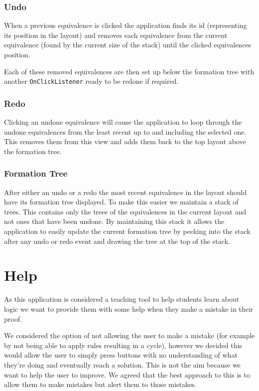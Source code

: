 \documentclass{report}
\begin{document}
\subsubsection{Undo}

When a previous equivalence is clicked the application finds its id (representing its position in the layout) and removes each equivalence from the current equivalence (found by the current size of the stack) until the clicked equivalences position. 

Each of these removed equivalences are then set up below the formation tree with another {\tt OnClickListener} ready to be redone if required.

\subsubsection{Redo}

Clicking an undone equivalence will cause the application to loop through the undone equivalences from the least recent up to and including the selected one. This removes them from this view and adds them back to the top layout above the formation tree. 

\subsubsection{Formation Tree}

After either an undo or a redo the most recent equivalence in the layout should have its formation tree displayed. To make this easier we maintain a stack of trees. This contains only the trees of the equivalences in the current layout and not ones that have been undone. By maintaining this stack it allows the application to easily update the current formation tree by peeking into the stack after any undo or redo event and drawing the tree at the top of the stack.

\section{Help}

As this application is considered a teaching tool to help students learn about logic we want to provide them with some help when they make a mistake in their proof.

We considered the option of not allowing the user to make a mistake (for example by not being able to apply rules resulting in a cycle), however we decided this would allow the user to simply press buttons with no understanding of what they're doing and eventually reach a solution. This is not the aim because we want to help the user to improve. We agreed that the best approach to this is to allow them to make mistakes but alert them to those mistakes.
\end{document}
